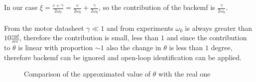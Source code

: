 In our case $\xi = \frac{c+\gamma}{2\omega_0}= \frac{c}{2\omega_0}+ \frac{\gamma}{2\omega_0}$, so the contribution of the backemf is $\frac{\gamma}{2\omega_0}$. \\ \\
From the motor datasheet $\gamma \ll 1$ and from experiments $\omega_0$ is always greater than $10 \frac{rad}{sec}$, therefore the contribution is small, less than $1$ and since the contribution to $\theta$ is linear with proportion $\sim 1$ also the change in $\theta$ is less than $1$ degree, therefore backemf can be ignored and open-loop identification can be applied.

\begin{figure}
\centering
{}
\caption{Comparison of the approximated value of $\theta$ with the real one} \label{fig:theta_comparison}
\end{figure}